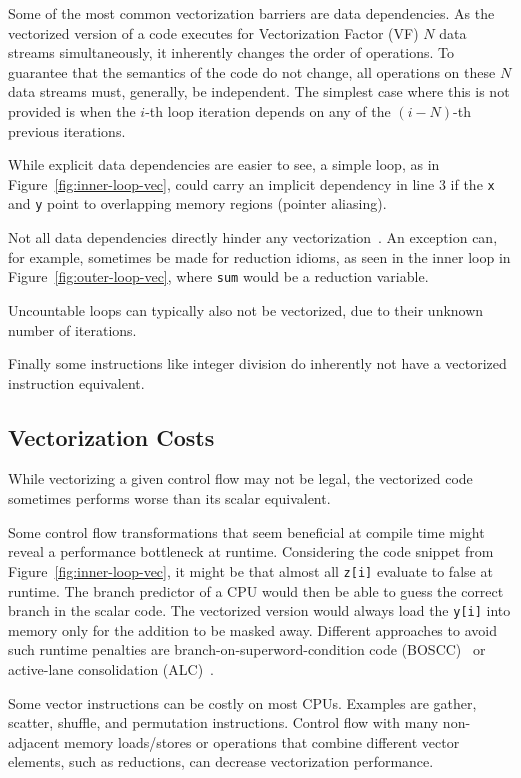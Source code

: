 \documentclass[sigplan,11pt,nonacm]{acmart}
\begin{document}
Some of the most common vectorization barriers are data dependencies. As the vectorized version
of a code executes for Vectorization Factor (VF) $N$ data streams simultaneously, it inherently changes
the order of operations. To guarantee that the semantics of the code do not change, all
operations on these $N$ data streams must, generally, be independent. The simplest case
where this is not provided is when the $i$-th loop iteration depends on any of the $(i-N)$-th 
previous iterations.

While explicit data dependencies are easier to see, a simple loop, as in 
Figure~\ref{fig:inner-loop-vec}, could carry an implicit dependency in line 3 if
the \texttt{x} and \texttt{y} point to overlapping memory regions (pointer aliasing).

Not all data dependencies directly hinder any vectorization~\cite{datadepvec}. An exception can, for example, 
sometimes be made for reduction idioms, as seen in the inner loop in 
Figure~\ref{fig:outer-loop-vec}, where \texttt{sum} would be a reduction variable.

Uncountable loops can typically also not be vectorized, due to their unknown number of iterations.

Finally some instructions like integer division do inherently not have a vectorized instruction equivalent.

\subsection{Vectorization Costs}
While vectorizing a given control flow may not be legal, the vectorized code sometimes performs 
worse than its scalar equivalent.

Some control flow transformations that seem beneficial at compile time might reveal a performance
bottleneck at runtime. Considering the code snippet from Figure~\ref{fig:inner-loop-vec}, it might
be that almost all \texttt{z[i]} evaluate to false at runtime. The branch predictor of a CPU
would then be able to guess the correct branch in the scalar code. The vectorized version would
always load the \texttt{y[i]} into memory only for the addition to be masked away. Different 
approaches to avoid such runtime penalties are branch-on-superword-condition code 
(BOSCC)~\cite{10.5555/1299042.1299055,llvmboscc} or active-lane 
consolidation (ALC)~\cite{10.1007/s11227-022-04359-w,10.5555/3615924.3615932}.

Some vector instructions can be costly on most CPUs. Examples are gather, scatter, shuffle,
and permutation instructions. Control flow with many non-adjacent memory loads/stores or 
operations that combine different vector elements, such as reductions, can decrease vectorization 
performance.
\end{document}
